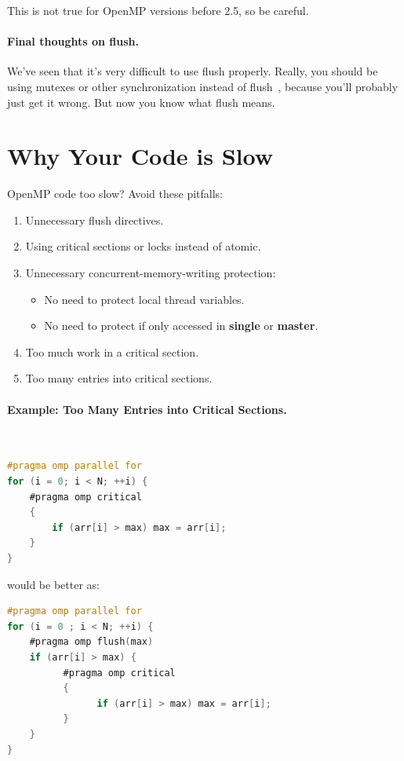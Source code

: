 \documentclass[a4paper]{report}
\begin{document}
This is not true for OpenMP versions before 2.5, so be careful.

\paragraph{Final thoughts on flush.} We've seen that it's very difficult to use flush properly. Really, you should be using mutexes or other synchronization instead of flush~\cite{flush}, because you'll probably just get it wrong. But now you know what flush means.


\section*{Why Your Code is Slow}
OpenMP code too slow? Avoid these pitfalls:
  \begin{enumerate}
    \item Unnecessary flush directives.
    \item Using critical sections or locks instead of atomic.
    \item Unnecessary concurrent-memory-writing protection:
      \begin{itemize}
        \item No need to protect local thread variables.
        \item No need to protect if only accessed in {\bf single} or
          {\bf master}.
      \end{itemize}
    \item Too much work in a critical section.
    \item Too many entries into critical sections.
  \end{enumerate}

\paragraph{Example: Too Many Entries into Critical Sections.}~

  \begin{lstlisting}[language=C]
#pragma omp parallel for
for (i = 0; i < N; ++i) { 
    #pragma omp critical
    {
        if (arr[i] > max) max = arr[i];
    } 
}
  \end{lstlisting}

would be better as:

  \begin{lstlisting}[language=C]
#pragma omp parallel for
for (i = 0 ; i < N; ++i) { 
    #pragma omp flush(max)
    if (arr[i] > max) {
          #pragma omp critical
          {
                if (arr[i] > max) max = arr[i];
          }
    }
}
\end{lstlisting}
\end{document}
